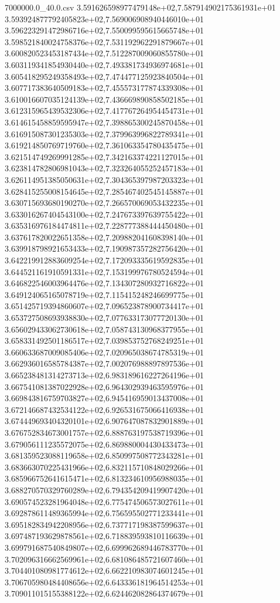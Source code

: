 \begin{filecontents*}{7000000.0_40.0.csv}
3.591626598977479148e+02,7.587914902175361931e+01
3.593924877792405823e+02,7.569006908940446010e+01
3.596223291472986716e+02,7.550099595615665748e+01
3.598521840024758376e+02,7.531192962291879667e+01
3.600820523453187434e+02,7.512287009060855780e+01
3.603119341854930440e+02,7.493381734936974681e+01
3.605418295249358493e+02,7.474477125923840504e+01
3.607717383640509183e+02,7.455573177874339308e+01
3.610016607035124139e+02,7.436669890858502185e+01
3.612315965439532306e+02,7.417767264954454731e+01
3.614615458859595947e+02,7.398865300245870458e+01
3.616915087301235303e+02,7.379963996822789341e+01
3.619214850769719760e+02,7.361063354780435475e+01
3.621514749269991285e+02,7.342163374221127015e+01
3.623814782806981043e+02,7.323264055252457183e+01
3.626114951385050631e+02,7.304365397987203323e+01
3.628415255008154645e+02,7.285467402545145887e+01
3.630715693680190270e+02,7.266570069053432235e+01
3.633016267404543100e+02,7.247673397639755422e+01
3.635316976184474811e+02,7.228777388444450480e+01
3.637617820022651358e+02,7.209882041608398140e+01
3.639918798921653433e+02,7.190987357282756420e+01
3.642219912883609254e+02,7.172093335619592835e+01
3.644521161910591331e+02,7.153199976780524594e+01
3.646822546003964476e+02,7.134307280932716822e+01
3.649124065165078719e+02,7.115415248246699775e+01
3.651425719394860607e+02,7.096523878900734417e+01
3.653727508693938830e+02,7.077633173077720130e+01
3.656029433062730618e+02,7.058743130968377955e+01
3.658331492501186517e+02,7.039853752768249251e+01
3.660633687009085406e+02,7.020965038674785319e+01
3.662936016585784387e+02,7.002076988897897536e+01
3.665238481314273713e+02,6.983189616227264196e+01
3.667541081387022928e+02,6.964302939463595976e+01
3.669843816759703827e+02,6.945416959013437008e+01
3.672146687432534122e+02,6.926531675066416938e+01
3.674449693404320101e+02,6.907647087832901889e+01
3.676752834673001757e+02,6.888763197538719396e+01
3.679056111235572075e+02,6.869880004430433473e+01
3.681359523088119658e+02,6.850997508772343281e+01
3.683663070225431966e+02,6.832115710848029266e+01
3.685966752641615471e+02,6.813234610956988035e+01
3.688270570329760289e+02,6.794354209419907420e+01
3.690574523281964048e+02,6.775474506573027611e+01
3.692878611489365994e+02,6.756595502771233441e+01
3.695182834942208956e+02,6.737717198387599637e+01
3.697487193629878561e+02,6.718839593810116639e+01
3.699791687540849807e+02,6.699962689446783770e+01
3.702096316662569961e+02,6.681086485721607460e+01
3.704401080981774612e+02,6.662210983074601245e+01
3.706705980484408656e+02,6.643336181964514253e+01
3.709011015155388122e+02,6.624462082864374679e+01

\end{filecontents*}
